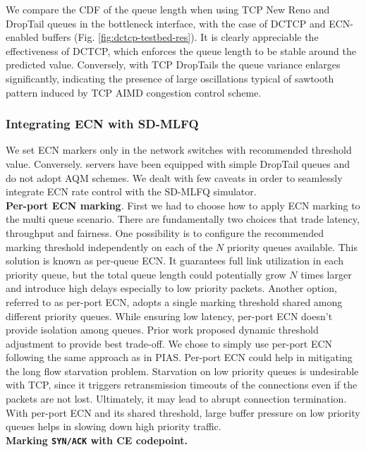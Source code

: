We compare the CDF of the queue length when using TCP New Reno and DropTail queues in the bottleneck interface, with the case of DCTCP and ECN-enabled buffers (Fig. \ref{fig:dctcp-testbed-res}).  
It is clearly appreciable the effectiveness of DCTCP, which enforces the queue length to be stable around the predicted value. Conversely, with TCP DropTails the queue variance enlarges significantly, indicating the presence of large oscillations typical of sawtooth pattern induced by TCP AIMD congestion control scheme.
\subsubsection{Integrating ECN with SD-MLFQ}
We set ECN markers only in the network switches with recommended \cite{dctcp} threshold value. Conversely. servers have been equipped with simple DropTail queues and do not adopt AQM schemes. We dealt with few caveats in order to seamlessly integrate ECN rate control with the SD-MLFQ simulator. \\
\textbf{Per-port ECN marking}. First we had to choose how to apply ECN marking to the multi queue scenario. There are fundamentally two choices that trade latency, throughput and fairness. One possibility is to configure the recommended marking threshold independently on each of the $N$ priority queues available. This solution is known as per-queue ECN. It guarantees full link utilization in each priority queue, but the total queue length could potentially grow $N$ times larger and introduce high delays especially to low priority packets. Another option, referred to as per-port ECN, adopts a single marking threshold shared among different priority queues. While ensuring low latency, per-port ECN doesn't provide isolation among queues. Prior work \cite{mqecn} proposed dynamic threshold adjustment to provide best trade-off. We chose to simply use per-port ECN following the same approach as in PIAS. Per-port ECN could help in mitigating the long flow starvation problem. Starvation on low priority queues is undesirable with TCP, since it triggers retransmission timeouts of the connections even if the packets are not lost. Ultimately, it may lead to abrupt connection termination. With per-port ECN and its shared threshold, large buffer pressure on low priority queues helps in slowing down high priority traffic. \\ %
\textbf{Marking \texttt{SYN/ACK} with CE codepoint.}
